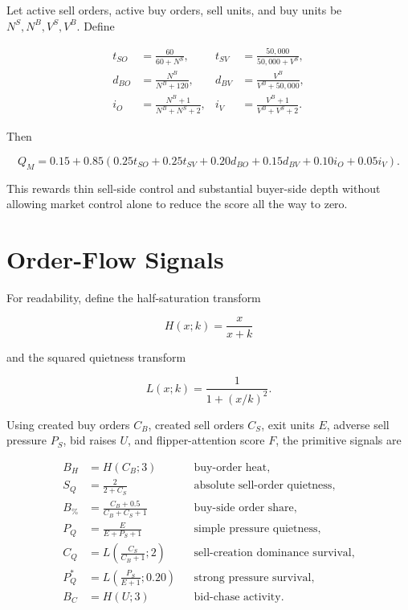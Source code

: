 \documentclass[11pt,a4paper]{article}
\begin{document}
Let active sell orders, active buy orders, sell units, and buy units be
$N^S,N^B,V^S,V^B$. Define

\begin{align}
t_{SO}&=\frac{60}{60+N^S},&
t_{SV}&=\frac{50{,}000}{50{,}000+V^S},\\
d_{BO}&=\frac{N^B}{N^B+120},&
d_{BV}&=\frac{V^B}{V^B+50{,}000},\\
i_O&=\frac{N^B+1}{N^B+N^S+2},&
i_V&=\frac{V^B+1}{V^B+V^S+2}.
\end{align}

Then

\begin{equation}
Q_M=0.15+0.85(0.25t_{SO}+0.25t_{SV}+0.20d_{BO}
+0.15d_{BV}+0.10i_O+0.05i_V).
\end{equation}

This rewards thin sell-side control and substantial buyer-side depth without allowing market
control alone to reduce the score all the way to zero.

\section{Order-Flow Signals}

For readability, define the half-saturation transform

\begin{equation}
H(x;k)=\frac{x}{x+k}
\end{equation}

and the squared quietness transform

\begin{equation}
L(x;k)=\frac{1}{1+(x/k)^2}.
\end{equation}

Using created buy orders $C_B$, created sell orders $C_S$, exit units $E$, adverse sell
pressure $P_S$, bid raises $U$, and flipper-attention score $F$, the primitive signals are

\begin{align}
B_H &= H(C_B;3) && \text{buy-order heat},\\
S_Q &= \frac{2}{2+C_S} && \text{absolute sell-order quietness},\\
B_\% &= \frac{C_B+0.5}{C_B+C_S+1} && \text{buy-side order share},\\
P_Q &= \frac{E}{E+P_S+1} && \text{simple pressure quietness},\\
C_Q &= L\!\left(\frac{C_S}{C_B+1};2\right) && \text{sell-creation dominance survival},\\
P_Q^*&=L\!\left(\frac{P_S}{E+1};0.20\right) && \text{strong pressure survival},\\
B_C &= H(U;3) && \text{bid-chase activity}.
\end{align}
\end{document}
